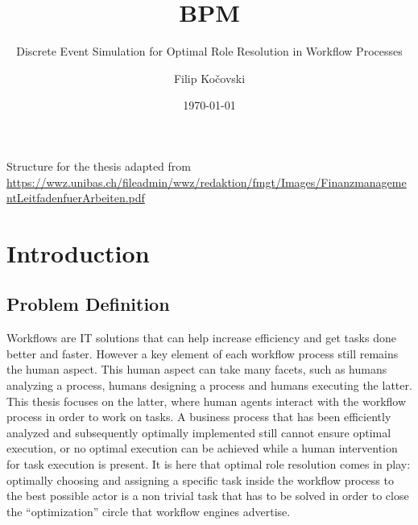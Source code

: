 \documentclass{seal_thesis}
\date{\today}
\title{BPM}
\subtitle{Discrete Event Simulation for Optimal Role Resolution in Workflow Processes}
\author{Filip Ko\v{c}ovski}
\begin{document}
\maketitle

\frontmatter

\begin{acknowledgements}

\end{acknowledgements}

\begin{abstract}

\end{abstract}

\begin{zusammenfassung}

\end{zusammenfassung}

\tableofcontents
\listoffigures
\listoftables
\lstlistoflistings

\pagebreak

\mainmatter

Structure for the thesis adapted from \url{https://wwz.unibas.ch/fileadmin/wwz/redaktion/fmgt/Images/FinanzmanagementLeitfadenfuerArbeiten.pdf}

\chapter{Introduction}
\label{ch:intro}

\section{Problem Definition}

Workflows are IT solutions that can help increase efficiency and get tasks done better and faster. However a key element of each workflow process still remains the human aspect. This human aspect can take many facets, such as humans analyzing a process, humans designing a process and humans executing the latter. This thesis focuses on the latter, \ie where human agents interact with the workflow process in order to work on tasks. A business process that has been efficiently analyzed and subsequently optimally implemented still cannot ensure optimal execution, or no optimal execution can be achieved while a human intervention for task execution is present. It is here that optimal role resolution comes in play: optimally choosing and assigning a specific task inside the workflow process to the best possible actor is a non trivial task that has to be solved in order to close the ``optimization'' circle that workflow engines advertise.
\end{document}
